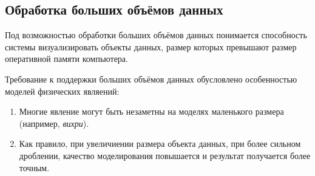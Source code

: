\documentclass[a4paper,12pt]{extarticle}
\begin{document}
\subsection{Обработка больших объёмов данных}
Под возможностью обработки больших объёмов данных понимается способность системы визуализировать объекты данных, размер которых превышают размер оперативной памяти компьютера.

Требование к поддержки больших объёмов данных обусловлено особенностью моделей физических являений:
\begin{enumerate}
    \item Многие явление могут быть незаметны на моделях маленького размера (например, \textit{вихри}).
    
    \item Как правило, при увеличиении размера объекта данных, при более сильном дроблении, качество моделирования повышается и результат получается более точным.
\end{enumerate}
\end{document}
